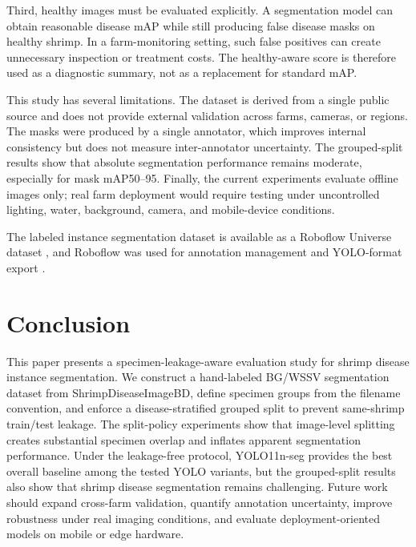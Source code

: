 \documentclass{svproc}
\begin{document}
Third, healthy images must be evaluated explicitly. A segmentation model can obtain reasonable disease mAP while still producing false disease masks on healthy shrimp. In a farm-monitoring setting, such false positives can create unnecessary inspection or treatment costs. The healthy-aware score is therefore used as a diagnostic summary, not as a replacement for standard mAP.

This study has several limitations. The dataset is derived from a single public source and does not provide external validation across farms, cameras, or regions. The masks were produced by a single annotator, which improves internal consistency but does not measure inter-annotator uncertainty. The grouped-split results show that absolute segmentation performance remains moderate, especially for mask mAP50--95. Finally, the current experiments evaluate offline images only; real farm deployment would require testing under uncontrolled lighting, water, background, camera, and mobile-device conditions.

The labeled instance segmentation dataset is available as a Roboflow Universe dataset \cite{nguyen2026shrimpseg}, and Roboflow was used for annotation management and YOLO-format export \cite{roboflow}.

\section{Conclusion}

This paper presents a specimen-leakage-aware evaluation study for shrimp disease instance segmentation. We construct a hand-labeled BG/WSSV segmentation dataset from ShrimpDiseaseImageBD, define specimen groups from the filename convention, and enforce a disease-stratified grouped split to prevent same-shrimp train/test leakage. The split-policy experiments show that image-level splitting creates substantial specimen overlap and inflates apparent segmentation performance. Under the leakage-free protocol, YOLO11n-seg provides the best overall baseline among the tested YOLO variants, but the grouped-split results also show that shrimp disease segmentation remains challenging. Future work should expand cross-farm validation, quantify annotation uncertainty, improve robustness under real imaging conditions, and evaluate deployment-oriented models on mobile or edge hardware.



\end{document}
